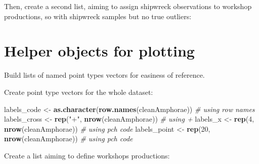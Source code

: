 \documentclass[12pt,]{book}
\newenvironment{Shaded}{\begin{snugshade}}{\end{snugshade}}
\newcommand{\CommentTok}[1]{\textcolor[rgb]{0.56,0.35,0.01}{\textit{#1}}}
\newcommand{\DataTypeTok}[1]{\textcolor[rgb]{0.13,0.29,0.53}{#1}}
\newcommand{\DecValTok}[1]{\textcolor[rgb]{0.00,0.00,0.81}{#1}}
\newcommand{\KeywordTok}[1]{\textcolor[rgb]{0.13,0.29,0.53}{\textbf{#1}}}
\newcommand{\NormalTok}[1]{#1}
\newcommand{\OperatorTok}[1]{\textcolor[rgb]{0.81,0.36,0.00}{\textbf{#1}}}
\newcommand{\StringTok}[1]{\textcolor[rgb]{0.31,0.60,0.02}{#1}}
\begin{document}
Then, create a second list, aiming to assign shipwreck observations to workshop productions, so with shipwreck samples but no true outliers:

\begin{Shaded}
\end{Shaded}

\hypertarget{helper-objects-for-plotting}{%
\section{Helper objects for plotting}\label{helper-objects-for-plotting}}

Build lists of named point types vectors for easiness of reference.

Create point type vectors for the whole dataset:

\begin{Shaded}
\begin{Highlighting}[]
\NormalTok{labels_code <-}\StringTok{ }\KeywordTok{as.character}\NormalTok{(}\KeywordTok{row.names}\NormalTok{(cleanAmphorae)) }\CommentTok{# using row names}
\NormalTok{labels_cross <-}\StringTok{ }\KeywordTok{rep}\NormalTok{(}\StringTok{"+"}\NormalTok{, }\KeywordTok{nrow}\NormalTok{(cleanAmphorae)) }\CommentTok{# using +}
\NormalTok{labels_x <-}\StringTok{ }\KeywordTok{rep}\NormalTok{(}\DecValTok{4}\NormalTok{, }\KeywordTok{nrow}\NormalTok{(cleanAmphorae)) }\CommentTok{# using pch code}
\NormalTok{labels_point <-}\StringTok{ }\KeywordTok{rep}\NormalTok{(}\DecValTok{20}\NormalTok{, }\KeywordTok{nrow}\NormalTok{(cleanAmphorae)) }\CommentTok{# using pch code}
\end{Highlighting}
\end{Shaded}

Create a list aiming to define workshops productions:
\end{document}

